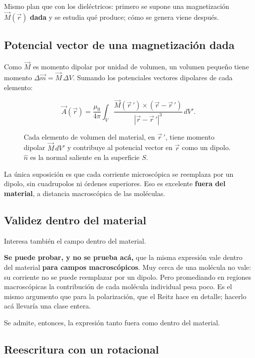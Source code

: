 \documentclass[12pt,a4paper]{article}
\begin{document}
Mismo plan que con los dieléctricos: primero se supone una magnetización
$\vec M(\vec r)$ \textbf{dada} y se estudia qué produce; cómo se genera viene
después.

\subsection{Potencial vector de una magnetización dada}

Como $\vec M$ es momento dipolar por unidad de volumen, un volumen pequeño
tiene momento $\Delta\vec m = \vec M\,\Delta V$. Sumando los potenciales
vectores dipolares de cada elemento:

\[
\vec A(\vec r) = \frac{\mu_0}{4\pi}\int_V
\frac{\vec M(\vec r\,')\times(\vec r-\vec r\,')}{|\vec r-\vec r\,'|^3}\,dV' .
\]

\begin{figure}[H]
  \centering
  
  \caption{Cada elemento de volumen del material, en $\vec r\,'$, tiene momento dipolar $\vec M\,dV'$ y contribuye al potencial vector en $\vec r$ como un dipolo. $\hat n$ es la normal saliente en la superficie $S$.}
\end{figure}

La única suposición es que cada corriente microscópica se reemplaza por un
dipolo, sin cuadrupolos ni órdenes superiores. Eso es excelente \textbf{fuera del
material}, a distancia macroscópica de las moléculas.

\subsection{Validez dentro del material}

Interesa también el campo dentro del material.

\begin{notebox}
\textbf{Se puede probar, y no se prueba acá,} que la misma expresión vale dentro
del material \textbf{para campos macroscópicos}. Muy cerca de una molécula no
vale: su corriente no se puede reemplazar por un dipolo. Pero promediando en
regiones macroscópicas la contribución de cada molécula individual pesa poco.
Es el mismo argumento que para la polarización, que el Reitz hace en detalle;
hacerlo acá llevaría una clase entera.
\end{notebox}

Se admite, entonces, la expresión tanto fuera como dentro del material.

\subsection{Reescritura con un rotacional}
\end{document}
